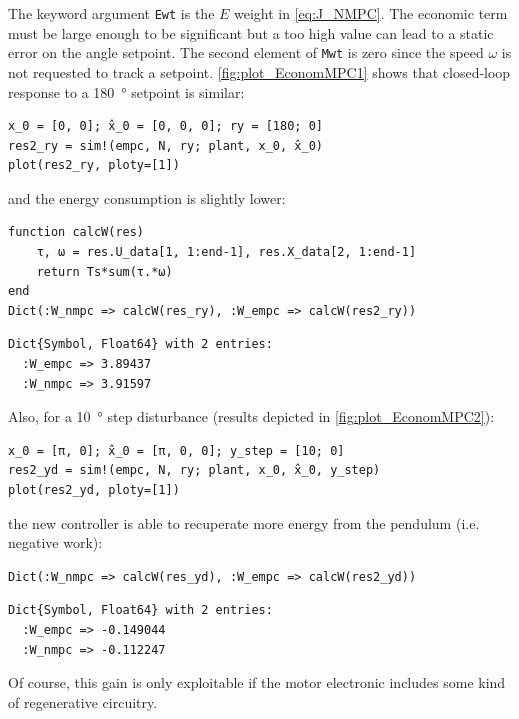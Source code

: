 The keyword argument \texttt{Ewt} is the $E$ weight in \eqref{eq:J_NMPC}. The economic term must be large enough to be significant but a too high value can lead to a static error on the angle setpoint. The second element of \texttt{Mwt} is zero since the speed $\omega$ is not requested to track a setpoint. \cref{fig:plot_EconomMPC1} shows that closed-loop response to a \SI{180}{\degree} setpoint is similar:
\begin{verbatim}
x_0 = [0, 0]; x̂_0 = [0, 0, 0]; ry = [180; 0]
res2_ry = sim!(empc, N, ry; plant, x_0, x̂_0)
plot(res2_ry, ploty=[1])
\end{verbatim}
and the energy consumption is slightly lower:
\begin{verbatim}
function calcW(res)
    τ, ω = res.U_data[1, 1:end-1], res.X_data[2, 1:end-1]
    return Ts*sum(τ.*ω)
end
Dict(:W_nmpc => calcW(res_ry), :W_empc => calcW(res2_ry))
\end{verbatim}
\spacerepl
\begin{verbatim}
Dict{Symbol, Float64} with 2 entries:
  :W_empc => 3.89437
  :W_nmpc => 3.91597
\end{verbatim}
Also, for a \SI{10}{\degree} step disturbance (results depicted in \cref{fig:plot_EconomMPC2}):
\begin{verbatim}
x_0 = [π, 0]; x̂_0 = [π, 0, 0]; y_step = [10; 0]
res2_yd = sim!(empc, N, ry; plant, x_0, x̂_0, y_step)
plot(res2_yd, ploty=[1])
\end{verbatim}
the new controller is able to recuperate more energy from the pendulum (i.e. negative work):
\begin{verbatim}
Dict(:W_nmpc => calcW(res_yd), :W_empc => calcW(res2_yd))
\end{verbatim}
\spacerepl
\begin{verbatim}
Dict{Symbol, Float64} with 2 entries:
  :W_empc => -0.149044
  :W_nmpc => -0.112247
\end{verbatim}
Of course, this gain is only exploitable if the motor electronic includes some kind of regenerative circuitry.

